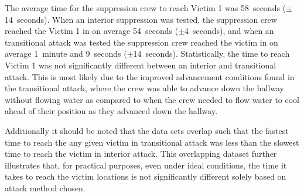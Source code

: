 \documentclass[12pt,oneside]{book}
\begin{document}
The average time for the suppression crew to reach Victim 1 was 58~seconds ($\pm$14~seconds). When an interior suppression was tested, the suppression crew reached the Victim 1 in on average 54~seconds ($\pm$4~seconds), and when an transitional attack was tested the suppression crew reached the victim in on average 1~minute and 9~seconds ($\pm$14~seconds). Statistically, the time to reach Victim 1 was not significantly different between an interior and transitional attack. This is most likely due to the improved advancement conditions found in the transitional attack, where the crew was able to advance down the hallway without flowing water as compared to when the crew needed to flow water to cool ahead of their position as they advanced down the hallway.

Additionally it should be noted that the data sets overlap such that the fastest time to reach the any given victim in transitional attack was less than the slowest time to reach the victim in interior attack. This overlapping dataset further illustrates that, for practical purposes, even under ideal conditions, the time it takes to reach the victim locations is not significantly different solely based on attack method chosen. 


\end{document}
